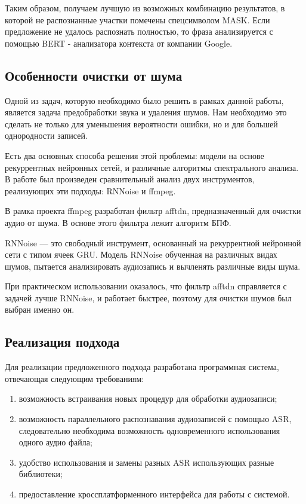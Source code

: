 \documentclass[conference]{IEEEtran}
\begin{document}
Таким образом, получаем лучшую из возможных комбинацию результатов, в которой не распознанные участки помечены спецсимволом MASK. Если предложение не удалось распознать полностью, то фраза анализируется с помощью BERT - анализатора контекста от компании Google.

\subsection{Особенности очистки от шума}
Одной из задач, которую необходимо было решить в рамках данной работы, является задача предобработки звука и удаления шумов. Нам необходимо это сделать не только для уменьшения вероятности ошибки, но и для большей однородности записей.

Есть два основных способа решения этой проблемы: модели на основе рекуррентных нейронных сетей, и различные алгоритмы спектрального анализа.
В работе был произведен сравнительный анализ двух инструментов, реализующих эти подходы: RNNoise и ffmpeg.

В рамка проекта ffmpeg разработан фильтр afftdn, предназначенный для очистки аудио от шума. В основе этого фильтра лежит алгоритм БПФ.

RNNoise — это свободный инструмент, основанный на рекуррентной нейронной сети с типом ячеек GRU. Модель RNNoise обученная на различных видах шумов, пытается анализировать аудиозапись и вычленять различные виды шума.

При практическом использовании оказалось, что фильтр afftdn справляется с задачей лучше RNNoise, и работает быстрее, поэтому для очистки шумов был выбран именно он.

\subsection{Реализация подхода}

Для реализации предложенного подхода разработана программная система, отвечающая следующим требованиям:

\begin{enumerate}
\item возможность встраивания новых процедур для обработки аудиозаписи;
\item возможность параллельного распознавания аудиозаписей с помощью ASR, следовательно необходима возможность одновременного использования одного аудио файла;
\item удобство использования и замены разных ASR использующих разные библиотеки;
\item предоставление кроссплатформенного интерфейса для работы с системой.
\end{enumerate}
\end{document}
